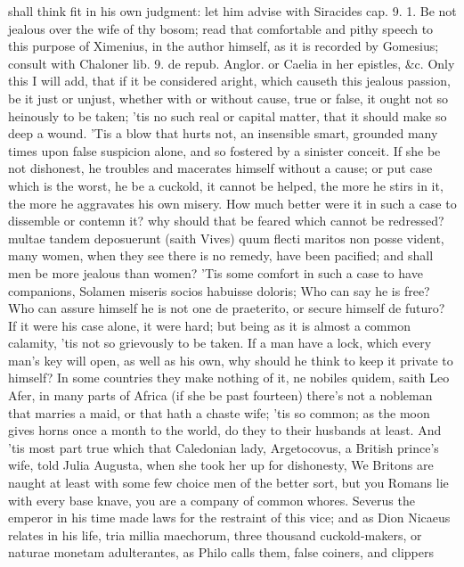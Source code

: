 {shall think fit in his own judgment: let him advise with Siracides cap.
9. 1. Be not jealous over the wife of thy bosom; read that comfortable
and pithy speech to this purpose of Ximenius, in the author himself, as
it is recorded by Gomesius; consult with Chaloner lib. 9. de repub.
Anglor. or Caelia in her epistles, \&c. Only this I will add, that if it
be considered aright, which causeth this jealous passion, be it just or
unjust, whether with or without cause, true or false, it ought not so
heinously to be taken; 'tis no such real or capital matter, that it
should make so deep a wound. 'Tis a blow that hurts not, an insensible
smart, grounded many times upon false suspicion alone, and so fostered
by a sinister conceit. If she be not dishonest, he troubles and
macerates himself without a cause; or put case which is the worst, he
be a cuckold, it cannot be helped, the more he stirs in it, the more he
aggravates his own misery. How much better were it in such a case to
dissemble or contemn it? why should that be feared which cannot be
redressed? multae tandem deposuerunt (saith Vives) quum flecti
maritos non posse vident, many women, when they see there is no remedy,
have been pacified; and shall men be more jealous than women? 'Tis some
comfort in such a case to have companions, Solamen miseris socios
habuisse doloris; Who can say he is free? Who can assure himself he is
not one de praeterito, or secure himself de futuro? If it were his case
alone, it were hard; but being as it is almost a common calamity, 'tis
not so grievously to be taken. If a man have a lock, which every man's
key will open, as well as his own, why should he think to keep it
private to himself? In some countries they make nothing of it, ne
nobiles quidem, saith Leo Afer, in many parts of Africa (if she
be past fourteen) there's not a nobleman that marries a maid, or that
hath a chaste wife; 'tis so common; as the moon gives horns once a
month to the world, do they to their husbands at least. And 'tis most
part true which that Caledonian lady, Argetocovus, a British
prince's wife, told Julia Augusta, when she took her up for dishonesty,
We Britons are naught at least with some few choice men of the better
sort, but you Romans lie with every base knave, you are a company of
common whores. Severus the emperor in his time made laws for the
restraint of this vice; and as Dion Nicaeus relates in his life,
tria millia maechorum, three thousand cuckold-makers, or naturae
monetam adulterantes, as Philo calls them, false coiners, and clippers
}
